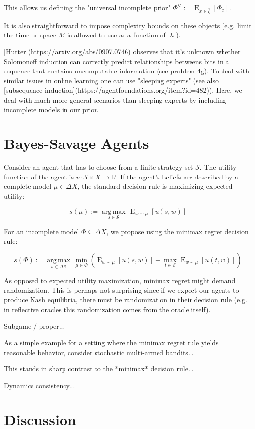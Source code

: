 \documentclass[a4paper]{article}
\DeclareMathOperator{\E}{E}
\newcommand{\Argmax}[1]{\underset{#1}{\operatorname{arg\,max}}\,}
\newcommand{\Reals}{\mathbb{R}}
\newcommand{\Abs}[1]{\lvert #1 \rvert}
\newcommand{\UTM}{\mathcal{U}}
\newcommand{\SP}[1]{\Delta #1}
\newcommand{\Strat}{\mathcal{S}}
\begin{document}
This allows us defining the "universal incomplete prior" ${\Phi^\UTM:=\E_{x \in \bar{\zeta}}[\Phi_x]}$.

It is also straightforward to impose complexity bounds on these objects (e.g. limit the time or space ${M}$ is allowed to use as a function of ${\Abs{h}}$).

[Hutter](https://arxiv.org/abs/0907.0746) observes that it's unknown whether Solomonoff induction can correctly predict relationships betweens bits in a sequence that contains uncomputable information (see problem 4g). To deal with similar issues in online learning one can use "sleeping experts" (see also [subsequence induction](https://agentfoundations.org/item?id=482)). Here, we deal with much more general scenarios than sleeping experts by including incomplete models in our prior.

\section{Bayes-Savage Agents}

Consider an agent that has to choose from a finite strategy set ${\Strat}$. The utility function of the agent is ${u: \Strat \times X \rightarrow \Reals}$. If the agent's beliefs are described by a complete model ${\mu \in \SP{X}}$, the standard decision rule is maximizing expected utility: 

$${s(\mu):=\Argmax{s \in \Strat} \E_{w \sim \mu}[u(s,w)]}$$

For an incomplete model ${\Phi \subseteq \SP{X}}$, we propose using the minimax regret decision rule:

$$s(\Phi):=\Argmax{s \in \SP{\Strat}} \min_{\mu \in \Phi}(\E_{w \sim \mu}[u(s,w)] - \max_{t \in \Strat} \E_{w \sim \mu}[u(t,w)])$$

As opposed to expected utility maximization, minimax regret might demand randomization. This is perhaps not surprising since if we expect our agents to produce Nash equilibria, there must be randomization in their decision rule (e.g. in reflective oracles this randomization comes from the oracle itself).

Subgame / proper...

As a simple example for a setting where the minimax regret rule yields reasonable behavior, consider stochastic multi-armed bandits...

This stands in sharp contrast to the *minimax* decision rule...

Dynamics consistency...

\section{Discussion}
\end{document}
